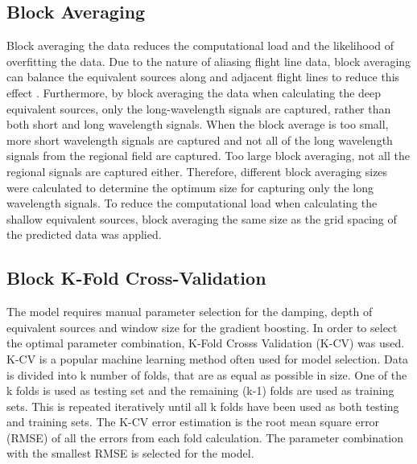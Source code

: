 \subsection{Block Averaging}
Block averaging the data reduces the computational load and the likelihood of overfitting the data. Due to the nature of aliasing flight line data, block averaging can balance the equivalent sources along and adjacent flight lines to reduce this effect \citep{SolerUieda2021}. Furthermore, by block averaging the data when calculating the deep equivalent sources, only the long-wavelength signals are captured, rather than both short and long wavelength signals. When the block average is too small, more short wavelength signals are captured and not all of the long wavelength signals from the regional field are captured. Too large block averaging, not all the regional signals are captured either. Therefore, different block averaging sizes were calculated to determine the optimum size for capturing only the long wavelength signals. To reduce the computational load when calculating the shallow equivalent sources, block averaging the same size as the grid spacing of the predicted data was applied.

\subsection{Block K-Fold Cross-Validation}
The model requires manual parameter selection for the damping, depth of equivalent sources and window size for the gradient boosting. In order to select the optimal parameter combination, K-Fold Crosss Validation (K-CV) was used. K-CV is a popular machine learning method often used for model selection. Data is divided into k number of folds, that are as equal as possible in size. One of the k folds is used as testing set and the remaining (k-1) folds are used as training sets. This is repeated iteratively until all k folds have been used as both testing and training sets. The K-CV error estimation is the root mean square error (RMSE) of all the errors from each fold calculation. The parameter combination with the smallest RMSE is selected for the model.




